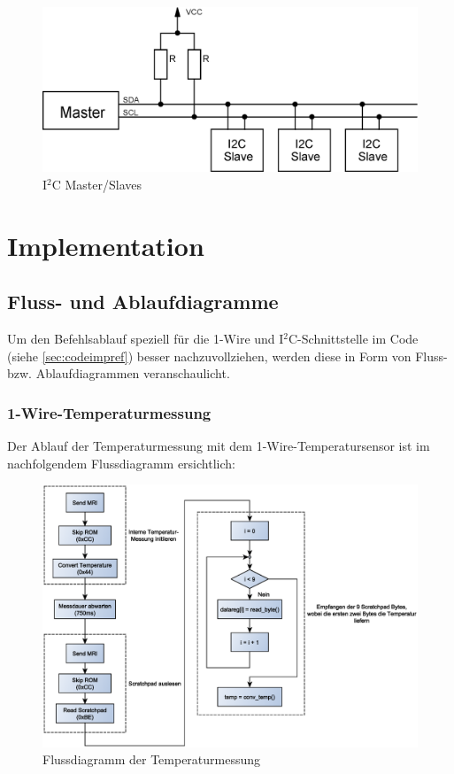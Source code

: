 \documentclass[12pt,a4paper]{article}
\begin{document}
\begin{figure}[H]
	\centering
	\includegraphics[width=0.9\linewidth]{i2c.eps}
	\caption{I$^{2}$C Master/Slaves}
	\label{figure:i2c}
\end{figure}

\pagebreak

\section{Implementation}
\subsection{Fluss- und Ablaufdiagramme}
\label{sec:flussablauf}
Um den Befehlsablauf speziell für die 1-Wire und I$^{2}$C-Schnittstelle im Code (siehe \ref{sec:codeimpref}) besser nachzuvollziehen, werden diese in Form von Fluss- bzw. Ablaufdiagrammen veranschaulicht.

\subsubsection{1-Wire-Temperaturmessung}
Der Ablauf der Temperaturmessung mit dem 1-Wire-Temperatursensor ist im nachfolgendem Flussdiagramm ersichtlich:

\begin{figure}[H]
	\centering
	\includegraphics[width=1\linewidth]{temp_mess_flussdiagramm_V01}
	\caption{Flussdiagramm der Temperaturmessung}
	\label{figure:onewirefluss}
\end{figure}
\end{document}
